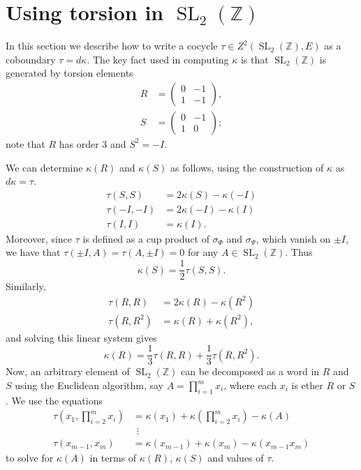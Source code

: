 \documentclass[10pt]{amsart}
\theoremstyle{plain}
\theoremstyle{definition}
\newcommand{\ZZ}{{\mathbb{Z}}}
\DeclareMathOperator{\SL}{SL}
\begin{document}
\section{Using torsion in \texorpdfstring{$\SL_2(\ZZ)$}{SL(2,Z)}} \label{sec:using_torsion}

In this section we describe how to write a cocycle $\tau \in Z^2(\SL_2(\ZZ), E)$ as a coboundary $\tau = d\kappa$.
The key fact used in computing $\kappa$ is that $\SL_2(\ZZ)$ is generated by torsion elements
\begin{align*}
R &= \begin{pmatrix} 0 & -1 \\ 1 & -1 \end{pmatrix}, \\
S &= \begin{pmatrix} 0 & -1 \\ 1 & 0 \end{pmatrix};
\end{align*}
note that $R$ has order $3$ and $S^2 = -I$.

We can determine $\kappa(R)$ and $\kappa(S)$ as follows, using the construction of $\kappa$ as $d\kappa = \tau$.
\begin{align*}
\tau(S,S) &= 2\kappa(S) - \kappa(-I) \\
\tau(-I,-I) &= 2\kappa(-I) - \kappa(I) \\
\tau(I,I) &= \kappa(I).
\end{align*}
Moreover, since $\tau$ is defined as a cup product of $\sigma_\Phi$ and $\sigma_\Psi$, which vanish on $\pm I$, we have that $\tau(\pm I, A) = \tau(A, \pm I) = 0$ for any $A \in \SL_2(\ZZ)$.  Thus
\begin{equation}
\kappa(S) = \frac12 \tau(S,S).
\end{equation}
Similarly,
\begin{align*}
\tau(R,R) &= 2\kappa(R) - \kappa(R^2) \\
\tau(R,R^2) &= \kappa(R) + \kappa(R^2),
\end{align*}
and solving this linear system gives
\begin{equation}
\kappa(R) = \frac13 \tau(R,R) + \frac13 \tau(R,R^2).
\end{equation}
Now, an arbitrary element of $\SL_2(\ZZ)$ can be decomposed as a word in $R$ and $S$ using the Euclidean algorithm, say $A = \prod_{i=1}^m x_i$, where each $x_i$ is ether $R$ or $S$.  We use the equations
\begin{align*}
\tau(x_1, \prod_{i=2}^m x_i) &= \kappa(x_1) + \kappa(\prod_{i=2}^m x_i) - \kappa(A) \\
&\hspace{5pt}\vdots \\
\tau(x_{m-1}, x_m) &= \kappa(x_{m-1}) + \kappa(x_m) - \kappa(x_{m-1}x_m)
\end{align*}
to solve for $\kappa(A)$ in terms of $\kappa(R)$, $\kappa(S)$ and values of $\tau$.
\end{document}
